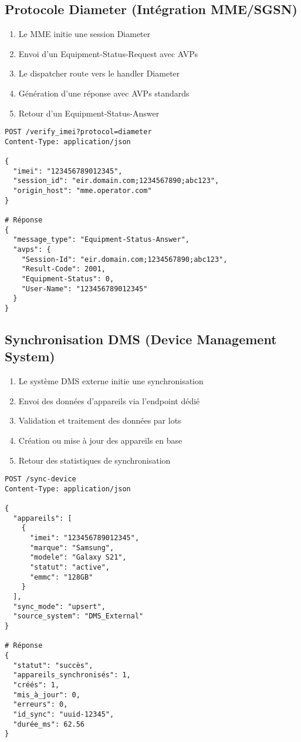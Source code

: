 \documentclass[11pt]{article}
\begin{document}
\subsection{Protocole Diameter (Intégration MME/SGSN)}

\begin{enumerate}
    \item Le MME initie une session Diameter
    \item Envoi d'un Equipment-Status-Request avec AVPs
    \item Le dispatcher route vers le handler Diameter
    \item Génération d'une réponse avec AVPs standards
    \item Retour d'un Equipment-Status-Answer
\end{enumerate}

\begin{lstlisting}[caption=Exemple Diameter]
POST /verify_imei?protocol=diameter
Content-Type: application/json

{
  "imei": "123456789012345",
  "session_id": "eir.domain.com;1234567890;abc123",
  "origin_host": "mme.operator.com"
}

# Réponse
{
  "message_type": "Equipment-Status-Answer",
  "avps": {
    "Session-Id": "eir.domain.com;1234567890;abc123",
    "Result-Code": 2001,
    "Equipment-Status": 0,
    "User-Name": "123456789012345"
  }
}
\end{lstlisting}

\subsection{Synchronisation DMS (Device Management System)}

\begin{enumerate}
    \item Le système DMS externe initie une synchronisation
    \item Envoi des données d'appareils via l'endpoint dédié
    \item Validation et traitement des données par lots
    \item Création ou mise à jour des appareils en base
    \item Retour des statistiques de synchronisation
\end{enumerate}

\begin{lstlisting}[caption=Exemple Synchronisation DMS]
POST /sync-device
Content-Type: application/json

{
  "appareils": [
    {
      "imei": "123456789012345",
      "marque": "Samsung",
      "modele": "Galaxy S21",
      "statut": "active",
      "emmc": "128GB"
    }
  ],
  "sync_mode": "upsert",
  "source_system": "DMS_External"
}

# Réponse
{
  "statut": "succès",
  "appareils_synchronisés": 1,
  "créés": 1,
  "mis_à_jour": 0,
  "erreurs": 0,
  "id_sync": "uuid-12345",
  "durée_ms": 62.56
}
\end{lstlisting}
\end{document}
